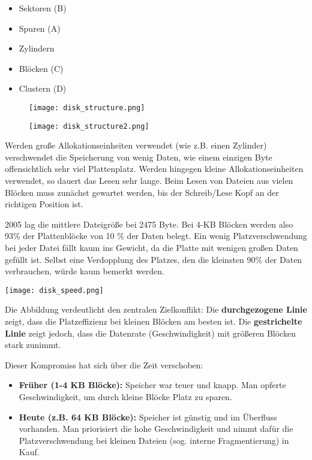 \begin{itemize}
    \item Sektoren (B)
    \item Spuren (A)
    \item Zylindern
    \item Blöcken (C)
    \item Clustern (D)
\end{itemize}

\begin{figure}[h!]
    \centering
    \begin{minipage}{0.48\textwidth}
        \centering
        \texttt{[image: disk\_structure.png]}
    \end{minipage}\hfill
    \begin{minipage}{0.48\textwidth}
        \centering
        \texttt{[image: disk\_structure2.png]}
    \end{minipage}
\end{figure}

Werden große Allokationseinheiten verwendet (wie z.B. einen Zylinder)
verschwendet die Speicherung von wenig Daten, wie einem einzigen Byte
offensichtlich sehr viel Plattenplatz. Werden hingegen kleine
Allokationseinheiten verwendet, so dauert das Lesen sehr lange. Beim Lesen von
Dateien aus vielen Blöcken muss zunächst gewartet werden, bis der Schreib/Lese
Kopf an der richtigen Position ist.

2005 lag die mittlere Dateigröße bei 2475 Byte. Bei 4-KB Blöcken werden also 93\%
der Plattenblöcke von 10 \% der Daten belegt. Ein wenig Platzverschwendung bei jeder
Datei fällt kaum ins Gewicht, da die Platte mit wenigen großen Daten gefüllt ist.
Selbst eine Verdopplung des Platzes, den die kleinsten 90\% der Daten verbrauchen,
würde kaum bemerkt werden.

\texttt{[image: disk\_speed.png]}

Die Abbildung verdeutlicht den zentralen Zielkonflikt: Die
\textbf{durchgezogene Linie} zeigt, dass die Platzeffizienz bei kleinen Blöcken
am besten ist. Die \textbf{gestrichelte Linie} zeigt jedoch, dass die Datenrate
(Geschwindigkeit) mit größeren Blöcken stark zunimmt.

Dieser Kompromiss hat sich über die Zeit verschoben:
\begin{itemize}
    \item \textbf{Früher (1-4 KB Blöcke):} Speicher war teuer und knapp. Man opferte
          Geschwindigkeit, um durch kleine Blöcke Platz zu sparen.
    \item \textbf{Heute (z.B. 64 KB Blöcke):} Speicher ist günstig und im Überfluss
          vorhanden. Man priorisiert die hohe Geschwindigkeit und nimmt dafür die
          Platzverschwendung bei kleinen Dateien (sog. interne Fragmentierung) in Kauf.
\end{itemize}

